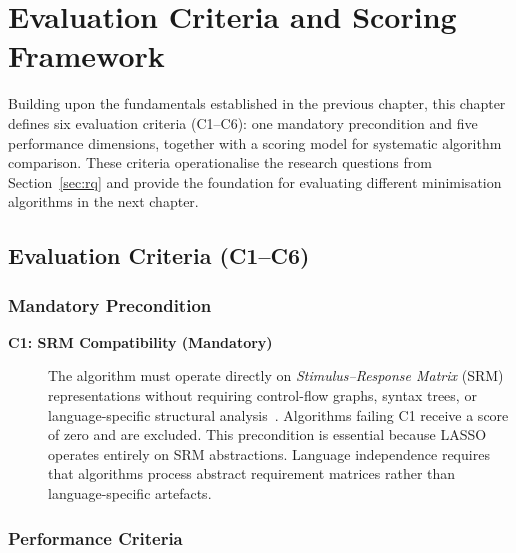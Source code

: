 \chapter{Evaluation Criteria and Scoring Framework}\label{chap:evaluation}

Building upon the fundamentals established in the previous chapter, this chapter defines six evaluation criteria (C1--C6): one mandatory precondition and five performance dimensions, together with a scoring model for systematic algorithm comparison. These criteria operationalise the research questions from Section~\ref{sec:rq} and provide the foundation for evaluating different minimisation algorithms in the next chapter.

\section{Evaluation Criteria (C1--C6)}

\subsection{Mandatory Precondition}

\begin{description}
  \item[\textbf{C1: SRM Compatibility (Mandatory)}] 
  The algorithm must operate directly on \emph{Stimulus--Response Matrix} (SRM) representations without requiring control-flow graphs, syntax trees, or language-specific structural analysis~\cite{Kessel2022}. 
  Algorithms failing C1 receive a score of zero and are excluded. 
  This precondition is essential because LASSO operates entirely on SRM abstractions. Language independence requires that algorithms process abstract requirement matrices rather than language-specific artefacts.
\end{description}

\subsection{Performance Criteria}

